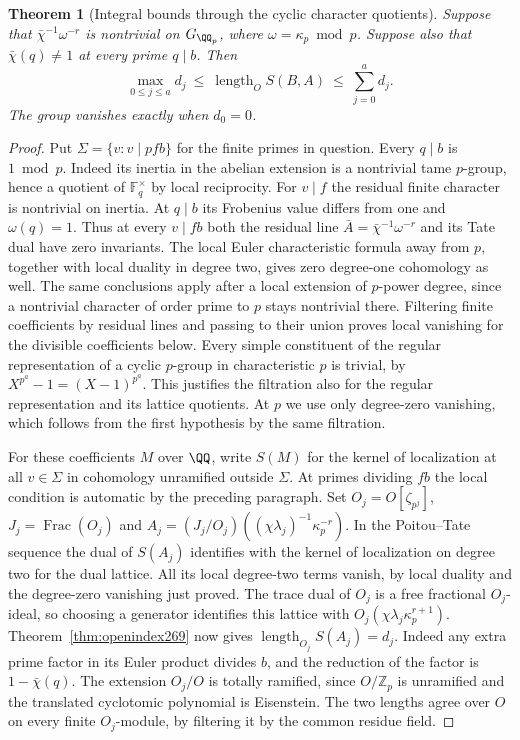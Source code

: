 \documentclass[a4paper,11pt]{article}
\newtheorem{theorem}[proposition]{Theorem}
\theoremstyle{definition}
\theoremstyle{remark}
\newcommand{\ZZ}{\mathbb Z}\newcommand{\ord}{\operatorname{ord}}
\newcommand{\len}{\operatorname{length}}\newcommand{\Res}{\operatorname*{Res}}
\numberwithin{equation}{section}
\begin{document}
\begin{theorem}[Integral bounds through the cyclic character quotients]\leavevmode
\label{thm:cyclic278}
Suppose that \(\bar\chi^{-1}\omega^{-r}\) is nontrivial on
\(G_{\QQ_p}\), where \(\omega=\kappa_p\bmod p\). Suppose also
that \(\bar\chi(q)\ne1\) at every prime \(q\mid b\). Then
\[
       \max_{0\le j\le a}d_j
          \ \le\ \len_O S(B,A)\ \le\ \sum_{j=0}^a d_j .
\]
The group vanishes exactly when \(d_0=0\).
\end{theorem}
\begin{proof}
Put \(\Sigma=\{v:v\mid pfb\}\) for the finite primes in question.
Every \(q\mid b\) is \(1\bmod p\). Indeed its inertia in the
abelian extension is a nontrivial tame \(p\)-group, hence a
quotient of \(\mathbb F_q^\times\) by local reciprocity.
For \(v\mid f\) the residual finite character is nontrivial on
inertia. At \(q\mid b\) its Frobenius value differs from one and
\(\omega(q)=1\). Thus at every \(v\mid fb\) both the residual
line \(\bar A=\bar\chi^{-1}\omega^{-r}\) and its Tate dual have
zero invariants. The local Euler characteristic formula away
from \(p\), together with local duality in degree two, gives
zero degree-one cohomology as well. The same conclusions apply
after a local extension of \(p\)-power degree, since a nontrivial
character of order prime to \(p\) stays nontrivial there.
Filtering finite coefficients by residual lines and passing to
their union proves local vanishing for the divisible coefficients
below. Every simple constituent of the regular representation of
a cyclic \(p\)-group in characteristic \(p\) is trivial, by
\(X^{p^a}-1=(X-1)^{p^a}\). This justifies the filtration also
for the regular representation and its lattice quotients.
At \(p\) we use only degree-zero vanishing, which follows from
the first hypothesis by the same filtration.

For these coefficients \(M\) over \(\QQ\), write \(S(M)\) for
the kernel of localization at all \(v\in\Sigma\) in cohomology
unramified outside \(\Sigma\). At primes dividing \(fb\) the
local condition is automatic by the preceding paragraph. Set
\(O_j=O[\zeta_{p^j}]\), \(J_j=\operatorname{Frac}(O_j)\) and
\(A_j=(J_j/O_j)((\chi\lambda_j)^{-1}\kappa_p^{-r})\).
In the Poitou--Tate sequence the dual of \(S(A_j)\) identifies
with the kernel of localization on degree two for the dual
lattice. All its local degree-two terms vanish, by local
duality and the degree-zero vanishing just proved. The trace
dual of \(O_j\) is a free fractional \(O_j\)-ideal, so choosing
a generator identifies this lattice with
\(O_j(\chi\lambda_j\kappa_p^{r+1})\).
Theorem~\ref{thm:openindex269} now gives
\(\len_{O_j}S(A_j)=d_j\). Indeed any extra prime factor in its
Euler product divides \(b\), and the reduction of the factor is
\(1-\bar\chi(q)\). The extension \(O_j/O\) is totally ramified,
since \(O/\ZZ_p\) is unramified and the translated cyclotomic
polynomial is Eisenstein. The two lengths agree over \(O\) on
every finite \(O_j\)-module, by filtering it by the common
residue field.


\end{proof}
\end{document}
